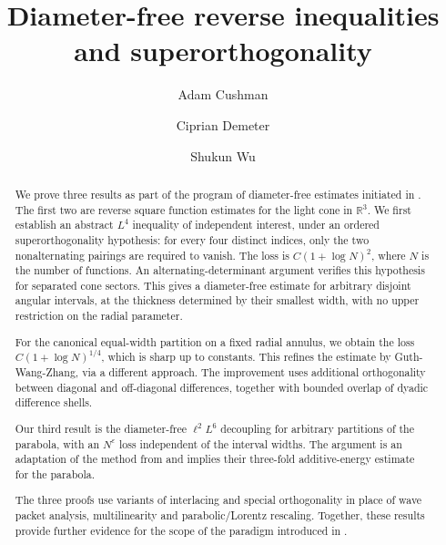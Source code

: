 \documentclass{amsart}
\numberwithin{equation}{section}
\begin{document}
\hypersetup{hidelinks}

\title{Diameter-free reverse inequalities and superorthogonality}

\author{Adam Cushman} \address{ Adam Cushman\\  Department of Mathematics\\ Indiana University Bloomington, USA} 

\author{Ciprian Demeter} \address{ Ciprian Demeter\\  Department of Mathematics\\ Indiana University Bloomington, USA} 

\author{Shukun Wu} \address{ Shukun Wu\\  Department of Mathematics\\ Indiana University Bloomington, USA} 

\begin{abstract}
We prove three results as part of the program of diameter-free estimates initiated in \cite{Cushman-Demeter-Wu}. 
The first two are reverse square function estimates for the light cone in $\mathbb{R}^3$. 
We first establish an abstract $L^4$ inequality of independent interest, under an ordered superorthogonality hypothesis: for every four distinct indices, only the two nonalternating pairings are required to vanish. 
The loss is $C(1+\log N)^2$, where $N$ is the number of functions.
An alternating-determinant argument verifies this hypothesis for separated cone sectors.
This gives a diameter-free estimate for
arbitrary disjoint angular intervals, at the thickness determined by their smallest width, with no upper restriction on the radial parameter. 

For the canonical equal-width partition on a fixed radial annulus, we obtain the loss $C(1+\log N)^{1/4}$, which is sharp up to constants. 
This refines the estimate by Guth-Wang-Zhang, via a different approach.
The improvement uses additional orthogonality between diagonal and off-diagonal differences, together with bounded overlap of dyadic difference shells. 

Our third result is the diameter-free $\ell^2L^6$ decoupling for arbitrary partitions of the parabola, with an $N^\varepsilon$ loss independent of the interval widths. 
The argument is an adaptation of the method from \cite{Cushman-Demeter-Wu} and implies their three-fold additive-energy estimate for the parabola. 

The three proofs use variants of interlacing and special orthogonality in place of wave packet analysis, multilinearity and parabolic/Lorentz rescaling.
Together, these results provide further evidence for the scope of the paradigm introduced in \cite{Cushman-Demeter-Wu}.
\end{abstract}
\end{document}
